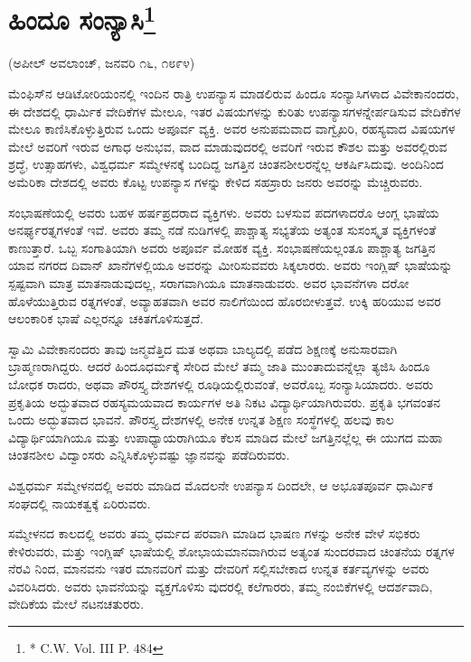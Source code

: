 \delimiter


\section[ಹಿಂದೂ ಸಂನ್ಯಾಸಿ]{ಹಿಂದೂ ಸಂನ್ಯಾಸಿ\protect\footnote{* C.W. Vol. III P. 484}}

\begin{center}
(ಅಪೀಲ್​ ಅವಲಾಂಚ್​, ಜನವರಿ ೧೬, ೧೮೯೪)
\end{center}

ಮೆಂಫಿಸ್​ನ ಆಡಿಟೋರಿಯಂನಲ್ಲಿ ಇಂದಿನ ರಾತ್ರಿ ಉಪನ್ಯಾಸ ಮಾಡಲಿರುವ ಹಿಂದೂ ಸಂನ್ಯಾಸಿಗಳಾದ ವಿವೇಕಾನಂದರು, ಈ ದೇಶದಲ್ಲಿ ಧಾರ್ಮಿಕ ವೇದಿಕೆಗಳ ಮೇಲೂ, ಇತರ ವಿಷಯಗಳನ್ನು ಕುರಿತು ಉಪನ್ಯಾಸಗಳನ್ನೇರ್ಪಡಿಸುವ ವೇದಿಕೆಗಳ ಮೇಲೂ ಕಾಣಿಸಿಕೊಳ್ಳುತ್ತಿರುವ ಒಂದು ಅಪೂರ್ವ ವ್ಯಕ್ತಿ. ಅವರ ಅನುಪಮವಾದ ವಾಗ್ವೈಖರಿ, ರಹಸ್ಯವಾದ ವಿಷಯಗಳ ಮೇಲೆ ಅವರಿಗೆ ಇರುವ ಅಗಾಧ ಅನುಭವ, ವಾದ ಮಾಡುವುದರಲ್ಲಿ ಅವರಿಗೆ ಇರುವ ಕೌಶಲ ಮತ್ತು ಅವರಲ್ಲಿರುವ ಶ್ರದ್ಧೆ, ಉತ್ಸಾಹಗಳು, ವಿಶ್ವಧರ್ಮ ಸಮ್ಮೇಳನಕ್ಕೆ ಬಂದಿದ್ದ ಜಗತ್ತಿನ ಚಿಂತನಶೀಲರನ್ನೆಲ್ಲ ಆಕರ್ಷಿಸಿದುವು. ಅಂದಿನಿಂದ ಅಮೆರಿಕಾ ದೇಶದಲ್ಲಿ ಅವರು ಕೊಟ್ಟ ಉಪನ್ಯಾಸ ಗಳನ್ನು ಕೇಳಿದ ಸಹಸ್ರಾರು ಜನರು ಅವರನ್ನು ಮೆಚ್ಚಿರುವರು.

ಸಂಭಾಷಣೆಯಲ್ಲಿ ಅವರು ಬಹಳ ಹರ್ಷಪ್ರದರಾದ ವ್ಯಕ್ತಿಗಳು. ಅವರು ಬಳಸುವ ಪದಗಳಾದರೊ ಆಂಗ್ಲ ಭಾಷೆಯ ಅನರ್ಘ್ಯರತ್ನಗಳಂತೆ ಇವೆ. ಅವರು ತಮ್ಮ ನಡೆ ನುಡಿಗಳಲ್ಲಿ ಪಾಶ್ಚಾತ್ಯ ಸಭ್ಯತೆಯ ಅತ್ಯಂತ ಸುಸಂಸ್ಕೃತ ವ್ಯಕ್ತಿಗಳಂತೆ ಕಾಣುತ್ತಾರೆ. ಒಬ್ಬ ಸಂಗಾತಿಯಾಗಿ ಅವರು ಅಪೂರ್ವ ಮೋಹಕ ವ್ಯಕ್ತಿ. ಸಂಭಾಷಣೆಯಲ್ಲಂತೂ ಪಾಶ್ಚಾತ್ಯ ಜಗತ್ತಿನ ಯಾವ ನಗರದ ದಿವಾನ್​ ಖಾನೆಗಳಲ್ಲಿಯೂ ಅವರನ್ನು ಮೀರಿಸುವವರು ಸಿಕ್ಕಲಾರರು. ಅವರು ಇಂಗ್ಲಿಷ್​ ಭಾಷೆಯನ್ನು ಸ್ಪಷ್ಟವಾಗಿ ಮಾತ್ರ ಮಾತನಾಡುವುದಲ್ಲ, ಸರಾಗವಾಗಿಯೂ ಮಾತನಾಡುವರು. ಅವರ ಭಾವನೆಗಳಾ ದರೋ ಹೊಳೆಯುತ್ತಿರುವ ರತ್ನಗಳಂತೆ, ಅವ್ಯಾಹತವಾಗಿ ಅವರ ನಾಲಿಗೆಯಿಂದ ಹೊರಬೀಳುತ್ತವೆ. ಉಕ್ಕಿ ಹರಿಯುವ ಅವರ ಆಲಂಕಾರಿಕ ಭಾಷೆ ಎಲ್ಲರನ್ನೂ ಚಕಿತಗೊಳಿಸುತ್ತದೆ.

ಸ್ವಾಮಿ ವಿವೇಕಾನಂದರು ತಾವು ಜನ್ಮವೆತ್ತಿದ ಮತ ಅಥವಾ ಬಾಲ್ಯದಲ್ಲಿ ಪಡೆದ ಶಿಕ್ಷಣಕ್ಕೆ ಅನುಸಾರವಾಗಿ ಬ್ರಾಹ್ಮಣರಾಗಿದ್ದರು. ಆದರೆ ಹಿಂದೂಧರ್ಮಕ್ಕೆ ಸೇರಿದ ಮೇಲೆ ತಮ್ಮ ಜಾತಿ ಮುಂತಾದುವನ್ನೆಲ್ಲಾ ತ್ಯಜಿಸಿ ಹಿಂದೂ ಬೋಧಕ ರಾದರು, ಅಥವಾ ಪೌರಸ್ತ್ಯ ದೇಶಗಳಲ್ಲಿ ರೂಢಿಯಲ್ಲಿರುವಂತೆ, ಅವರೊಬ್ಬ ಸಂನ್ಯಾಸಿಯಾದರು. ಅವರು ಪ್ರಕೃತಿಯ ಅದ್ಭುತವಾದ ರಹಸ್ಯಮಯವಾದ ಕಾರ್ಯಗಳ ಅತಿ ನಿಕಟ ವಿದ್ಯಾರ್ಥಿಯಾಗಿರುವರು. ಪ್ರಕೃತಿ ಭಗವಂತನ ಒಂದು ಅದ್ಭುತವಾದ ಭಾವನೆ. ಪೌರಸ್ತ್ಯ ದೇಶಗಳಲ್ಲಿ ಅನೇಕ ಉನ್ನತ ಶಿಕ್ಷಣ ಸಂಸ್ಥೆಗಳಲ್ಲಿ ಹಲವು ಕಾಲ ವಿದ್ಯಾರ್ಥಿಯಾಗಿಯೂ ಮತ್ತು ಉಪಾಧ್ಯಾಯರಾಗಿಯೂ ಕೆಲಸ ಮಾಡಿದ ಮೇಲೆ ಜಗತ್ತಿನಲ್ಲೆಲ್ಲ ಈ ಯುಗದ ಮಹಾ ಚಿಂತನಶೀಲ ವಿದ್ವಾಂಸರು ಎನ್ನಿಸಿಕೊಳ್ಳುವಷ್ಟು ಜ್ಞಾನವನ್ನು ಪಡೆದಿರುವರು.

ವಿಶ್ವಧರ್ಮ ಸಮ್ಮೇಳನದಲ್ಲಿ ಅವರು ಮಾಡಿದ ಮೊದಲನೇ ಉಪನ್ಯಾಸ ದಿಂದಲೇ, ಆ ಅಭೂತಪೂರ್ವ ಧಾರ್ಮಿಕ ಸಂಘದಲ್ಲಿ ನಾಯಕತ್ವಕ್ಕೆ ಏರಿರುವರು.

ಸಮ್ಮೇಳನದ ಕಾಲದಲ್ಲಿ ಅವರು ತಮ್ಮ ಧರ್ಮದ ಪರವಾಗಿ ಮಾಡಿದ ಭಾಷಣ ಗಳನ್ನು ಅನೇಕ ವೇಳೆ ಸಭಿಕರು ಕೇಳಿರುವರು, ಮತ್ತು ಇಂಗ್ಲಿಷ್​ ಭಾಷೆಯಲ್ಲಿ ಶೋಭಾಯಮಾನವಾಗಿರುವ ಅತ್ಯಂತ ಸುಂದರವಾದ ಚಿಂತನೆಯ ರತ್ನಗಳ ನೆರವಿ ನಿಂದ, ಮಾನವನು ಇತರ ಮಾನವರಿಗೆ ಮತ್ತು ದೇವರಿಗೆ ಸಲ್ಲಿಸಬೇಕಾದ ಉನ್ನತ ಕರ್ತವ್ಯಗಳನ್ನು ಅವರು ವಿವರಿಸಿದರು. ಅವರು ಭಾವನೆಯನ್ನು ವ್ಯಕ್ತಗೊಳಿಸು ವುದರಲ್ಲಿ ಕಲೆಗಾರರು, ತಮ್ಮ ನಂಬಿಕೆಗಳಲ್ಲಿ ಆದರ್ಶವಾದಿ, ವೇದಿಕೆಯ ಮೇಲೆ ನಟನಚತುರರು.

